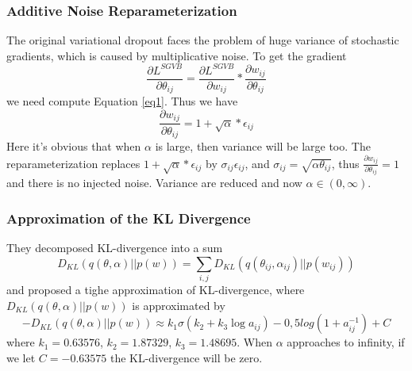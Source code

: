 \documentclass{article}
\begin{document}
	\subsubsection{Additive Noise Reparameterization}
	The original variational dropout faces the problem of huge variance of stochastic gradients, which is caused by multiplicative noise. To get the gradient
	\begin{equation}
	\frac{\partial L^{SGVB}}{\partial \theta_{ij}}=\frac{\partial L^{SGVB}}{\partial w_{ij}}*\frac{\partial w_{ij}}{\partial \theta_{ij}}
	\label{eq3}
	\end{equation}
	we need compute Equation \ref{eq1}. Thus we have
	\begin{equation}
	\frac{\partial w_{ij}}{\partial \theta_{ij}}=1+\sqrt{\alpha}*\epsilon_{ij}
	\end{equation}
	Here it’s obvious that when $\alpha$ is large, then variance will be large too. The reparameterization replaces $1+\sqrt{\alpha}*\epsilon_{ij}$ by $\sigma_{ij}\epsilon_{ij}$, and $\sigma_{ij}=\sqrt{\alpha\theta_{ij}}$, thus $\frac{\partial w_{ij}}{\partial \theta_{ij}}=1$ and there is no injected noise. Variance are reduced and now $\alpha \in (0, \infty)$.
	
	\subsubsection{Approximation of the KL Divergence}
	They decomposed KL-divergence into a sum
	\begin{equation}
	D_{KL}(q(\theta,\alpha)||p(w))=\sum_{i,j}D_{KL}(q(\theta_{ij},\alpha_{ij})||p(w_{ij}))
	\label{eq4}
	\end{equation}
	and proposed a tighe approximation of KL-divergence, where $D_{KL}(q(\theta,\alpha)||p(w))$ is approximated by
	\begin{equation}
	-D_{KL}(q(\theta,\alpha)||p(w))\approx k_1\sigma(k_2+k_3\log a_{ij})-0,5log(1+a_{ij}^{-1})+C
	\label{eq5}
	\end{equation}
	where $k_1=0.63576$, $k_2=1.87329$, $k_3=1.48695$. When $\alpha$ approaches to infinity, if we let $C=-0.63575$ the KL-divergence will be zero.
\end{document}
